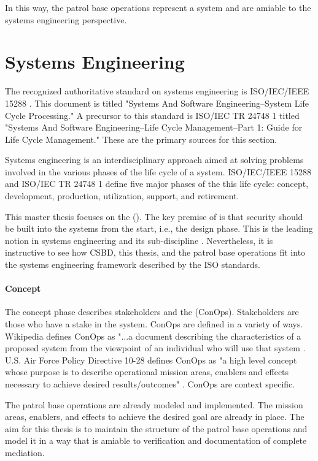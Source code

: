 \documentclass[../../main/main.tex]{subfiles}
\begin{document}
In this way, the patrol base operations represent a system and are amiable to the systems engineering perspective.  

\section{Systems Engineering}\label{sec:se}
The recognized authoritative standard on systems engineering is ISO/IEC/IEEE 15288 \cite{iso15288}.  This document is titled "Systems And Software Engineering--System Life Cycle Processing."  A precursor to this standard is ISO/IEC TR 24748 1 \cite{iso24748} titled "Systems And Software Engineering--Life Cycle Management--Part 1: Guide for Life Cycle Management."   These are the primary sources for this section.

Systems engineering is an interdisciplinary approach aimed at solving problems involved in the various phases of the life cycle of a system.  ISO/IEC/IEEE 15288 and ISO/IEC TR 24748 1 define five major phases of the this life cycle: concept, development, production, utilization, support, and retirement.
  
This master thesis focuses on the  ().  The key premise of  is that security should be built into the systems from the start, i.e., the design phase.  This is the leading notion in systems engineering and its sub-discipline .  Nevertheless, it is instructive to see how CSBD, this thesis, and the patrol base operations fit into the systems engineering framework described by the ISO standards.

\paragraph*{Concept} 
The concept phase describes stakeholders and the  (ConOps).  Stakeholders are those who have a stake in the system.  ConOps are defined in a variety of ways.  Wikipedia defines ConOps as "...a document describing the characteristics of a proposed system from the viewpoint of an individual who will use that system \cite{wikiconops}.  U.S. Air Force Policy Directive 10-28 defines ConOps as "a high level concept whose purpose is to describe operational mission areas, enablers and effects necessary to achieve desired results/outcomes" \cite{af1028}.  ConOps are context specific.  

The patrol base operations are already modeled and implemented. The mission areas, enablers, and effects to achieve the desired goal are already in place.  The aim for this thesis is to maintain the structure of the patrol base operations and model it in a way that is amiable to verification and documentation of complete mediation.
\end{document}
